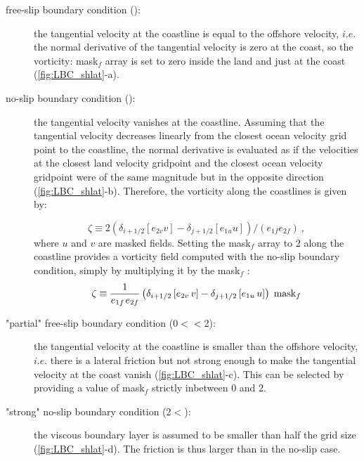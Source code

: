 \documentclass[../tex_main/NEMO_manual]{subfiles}
\begin{document}
\begin{description}

\item[free-slip boundary condition (): ]  the tangential velocity at the 
coastline is equal to the offshore velocity, $i.e.$ the normal derivative of the 
tangential velocity is zero at the coast, so the vorticity: mask$_{f}$ array is set 
to zero inside the land and just at the coast (\autoref{fig:LBC_shlat}-a).

\item[no-slip boundary condition (): ] the tangential velocity vanishes 
at the coastline. Assuming that the tangential velocity decreases linearly from 
the closest ocean velocity grid point to the coastline, the normal derivative is 
evaluated as if the velocities at the closest land velocity gridpoint and the closest 
ocean velocity gridpoint were of the same magnitude but in the opposite direction 
(\autoref{fig:LBC_shlat}-b). Therefore, the vorticity along the coastlines is given by: 

\begin{equation*}
\zeta \equiv 2 \left(\delta_{i+1/2} \left[e_{2v} v \right] - \delta_{j+1/2} \left[e_{1u} u \right] \right) / \left(e_{1f} e_{2f} \right) \ ,
\end{equation*}
where $u$ and $v$ are masked fields. Setting the mask$_{f}$ array to $2$ along 
the coastline provides a vorticity field computed with the no-slip boundary condition, 
simply by multiplying it by the mask$_{f}$ :
\begin{equation} \label{eq:lbc_bbbb}
\zeta \equiv \frac{1}{e_{1f} {\kern 1pt}e_{2f} }\left( {\delta _{i+1/2} 
\left[ {e_{2v} \,v} \right]-\delta _{j+1/2} \left[ {e_{1u} \,u} \right]} 
\right)\;\mbox{mask}_f 
\end{equation}

\item["partial" free-slip boundary condition (0$<$$<$2): ] the tangential 
velocity at the coastline is smaller than the offshore velocity, $i.e.$ there is a lateral 
friction but not strong enough to make the tangential velocity at the coast vanish 
(\autoref{fig:LBC_shlat}-c). This can be selected by providing a value of mask$_{f}$ 
strictly inbetween $0$ and $2$.

\item["strong" no-slip boundary condition (2$<$): ] the viscous boundary 
layer is assumed to be smaller than half the grid size (\autoref{fig:LBC_shlat}-d). 
The friction is thus larger than in the no-slip case.

\end{description}
\end{document}
